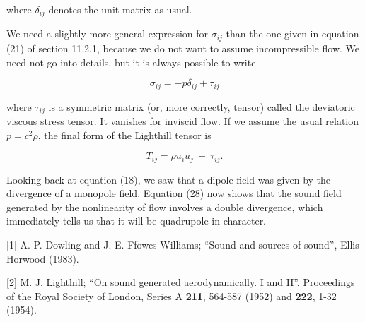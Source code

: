   where $\delta_{ij}$ denotes the unit matrix as usual. 

  We need a slightly more general expression for $\sigma_{ij}$ than the one 
  given in equation (21) of section 11.2.1, because we do not want to assume 
  incompressible flow. We need not go into details, but it is always possible 
  to write 

  $$\sigma_{ij} = -p \delta_{ij} + \tau_{ij} \tag{30}$$ 

  where $\tau_{ij}$ is a symmetric matrix (or, more correctly, tensor) called 
  the deviatoric viscous stress tensor. It vanishes for inviscid flow. If we 
  assume the usual relation $p=c^2 \rho$, the final form of the Lighthill 
  tensor is 

  $$T_{ij} = \rho u_i u_j \mathrm{~}-\mathrm{~} \tau_{ij} . \tag{31}$$ 

  Looking back at equation (18), we saw that a dipole field was given by the 
  divergence of a monopole field. Equation (28) now shows that the sound field 
  generated by the nonlinearity of flow involves a double divergence, which 
  immediately tells us that it will be quadrupole in character. 

  \sectionreferences{}[1] A. P. Dowling and J. E. Ffowcs Williams; “Sound and 
  sources of sound”, Ellis Horwood (1983). 

  [2] M. J. Lighthill; “On sound generated aerodynamically. I and II”. 
  Proceedings of the Royal Society of London, Series A \textbf{211}, 564-587 
  (1952) and \textbf{222}, 1-32 (1954). 
